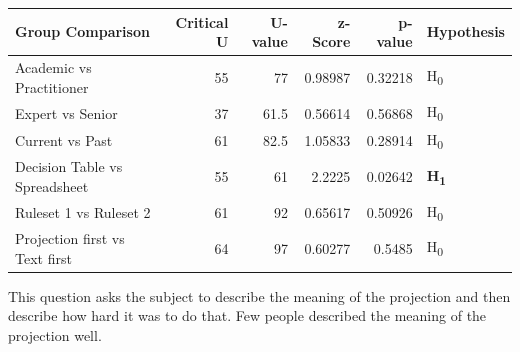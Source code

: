 \noindent\begin{minipage}{\linewidth}
    \centering
    \label{fig:stackedbar_Q2}
    
    \begin{tabular}{ |l ||r |r |r | r|l | } 
        \hline
        Group Comparison                 & Critical U & U-value & z-Score  & p-value & Hypothesis         \\
        \hline
        \hline
        Academic vs Practitioner         & 55        & 77      &  0.98987  & 0.32218 & H\textsubscript{0} \\ 
        \hline
        Expert vs Senior                 & 37        & 61.5    &  0.56614  & 0.56868 & H\textsubscript{0} \\ 
        \hline
        Current vs Past                  & 61        & 82.5    &  1.05833  & 0.28914 & H\textsubscript{0} \\ 
        \hline
        Decision Table vs Spreadsheet    & 55        & 61      &  2.2225   & 0.02642 & \textbf{H\textsubscript{1}}  \\ 
        \hline
        Ruleset 1 vs Ruleset 2           & 61        & 92      &  0.65617  & 0.50926 & H\textsubscript{0} \\ 
        \hline
        Projection first vs Text first   & 64        & 97      &  0.60277  & 0.5485  & H\textsubscript{0} \\ 
        \hline
    \end{tabular}
    \label{table:mannwhitneyQ2}
\end{minipage} 

This question asks the subject to describe the meaning of the projection and then describe how hard it was to do that.
Few people described the meaning of the projection well.

